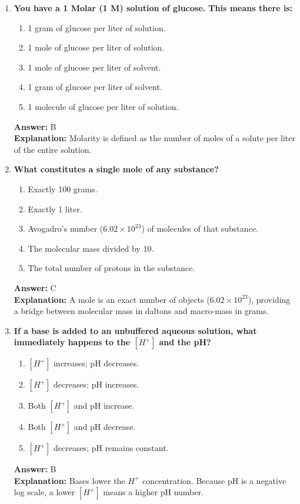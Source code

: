 \documentclass[11pt, a4paper]{article}
\begin{document}
\begin{enumerate}
\item \textbf{You have a 1 Molar (1 M) solution of glucose. This means there is:}
\begin{enumerate}[label=\Alph*.]
    \item 1 gram of glucose per liter of solution.
    \item 1 mole of glucose per liter of solution.
    \item 1 mole of glucose per liter of solvent.
    \item 1 gram of glucose per liter of solvent.
    \item 1 molecule of glucose per liter of solution.
\end{enumerate}
\textbf{Answer:} B \\
\textbf{Explanation:} Molarity is defined as the number of moles of a solute per liter of the entire solution.

\item \textbf{What constitutes a single mole of any substance?}
\begin{enumerate}[label=\Alph*.]
    \item Exactly 100 grams.
    \item Exactly 1 liter.
    \item Avogadro's number ($6.02 \times 10^{23}$) of molecules of that substance.
    \item The molecular mass divided by 10.
    \item The total number of protons in the substance.
\end{enumerate}
\textbf{Answer:} C \\
\textbf{Explanation:} A mole is an exact number of objects ($6.02 \times 10^{23}$), providing a bridge between molecular mass in daltons and macro-mass in grams.

\item \textbf{If a base is added to an unbuffered aqueous solution, what immediately happens to the $[H^+]$ and the pH?}
\begin{enumerate}[label=\Alph*.]
    \item $[H^+]$ increases; pH decreases.
    \item $[H^+]$ decreases; pH increases.
    \item Both $[H^+]$ and pH increase.
    \item Both $[H^+]$ and pH decrease.
    \item $[H^+]$ decreases; pH remains constant.
\end{enumerate}
\textbf{Answer:} B \\
\textbf{Explanation:} Bases lower the $H^+$ concentration. Because pH is a negative log scale, a lower $[H^+]$ means a higher pH number.


\end{enumerate}
\end{document}
